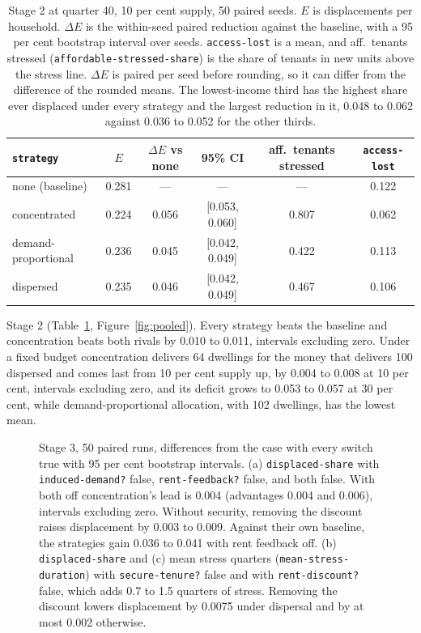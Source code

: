 \documentclass[10pt,a4paper]{article}
\begin{document}
\begin{table}[tp]
\centering
\caption{Stage 2 at quarter 40, 10 per cent supply, 50 paired seeds. $E$ is displacements per household. $\Delta E$ is the within-seed paired reduction against the baseline, with a 95 per cent bootstrap interval over seeds. \texttt{access-lost} is a mean, and aff.\ tenants stressed (\texttt{affordable-stressed-share}) is the share of tenants in new units above the stress line. $\Delta E$ is paired per seed before rounding, so it can differ from the difference of the rounded means. The lowest-income third has the highest share ever displaced under every strategy and the largest reduction in it, 0.048 to 0.062 against 0.036 to 0.052 for the other thirds.}
\label{tab:stage2}
\small
\begin{tabular}{lccccc}
\toprule
\texttt{strategy} & $E$ & $\Delta E$ vs none & \textbf{95\% CI} & \textbf{aff.\ tenants stressed} & \texttt{access-lost} \\
\midrule
none (baseline) & 0.281 & --- & --- & --- & 0.122 \\
concentrated & 0.224 & 0.056 & [0.053, 0.060] & 0.807 & 0.062 \\
demand-proportional & 0.236 & 0.045 & [0.042, 0.049] & 0.422 & 0.113 \\
dispersed & 0.235 & 0.046 & [0.042, 0.049] & 0.467 & 0.106 \\
\bottomrule
\end{tabular}
\end{table}

Stage 2 (Table~\ref{tab:stage2}, Figure~\ref{fig:pooled}). Every strategy beats the baseline and concentration beats both rivals by 0.010 to 0.011, intervals excluding zero. Under a fixed budget concentration delivers 64 dwellings for the money that delivers 100 dispersed and comes last from 10 per cent supply up, by 0.004 to 0.008 at 10 per cent, intervals excluding zero, and its deficit grows to 0.053 to 0.057 at 30 per cent, while demand-proportional allocation, with 102 dwellings, has the lowest mean.

\begin{figure}[t]
\centering
{}
\caption{Stage 3, 50 paired runs, differences from the case with every switch true with 95 per cent bootstrap intervals. (a) \texttt{displaced-share} with \texttt{induced-demand?} false, \texttt{rent-feedback?} false, and both false. With both off concentration's lead is 0.004 (advantages 0.004 and 0.006), intervals excluding zero. Without security, removing the discount raises displacement by 0.003 to 0.009. Against their own baseline, the strategies gain 0.036 to 0.041 with rent feedback off. (b) \texttt{displaced-share} and (c) mean stress quarters (\texttt{mean-stress-duration}) with \texttt{secure-tenure?} false and with \texttt{rent-discount?} false, which adds 0.7 to 1.5 quarters of stress. Removing the discount lowers displacement by 0.0075 under dispersal and by at most 0.002 otherwise.}
\label{fig:mechanism}
\end{figure}
\end{document}
